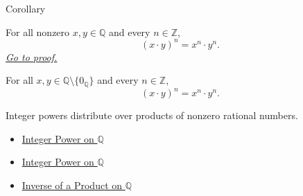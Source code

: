 \begin{corollarybox}{Corollary}
\begin{corollary}
\label{cor:power-of-product-on-q}
For all nonzero $x,y\in\mathbb{Q}$ and every $n\in\mathbb{Z}$,
\[
(x\cdot y)^n=x^n\cdot y^n.
\]
\hyperref[prf:power-of-product-on-q]{\textit{Go to proof.}}
\end{corollary}
\end{corollarybox}

\begin{remark*}
For all $x,y\in\mathbb{Q}\setminus\{0_{\mathbb{Q}}\}$ and every
$n\in\mathbb{Z}$,
\[
(x\cdot y)^n=x^n\cdot y^n.
\]
\end{remark*}

\begin{remark*}[Interpretation]
Integer powers distribute over products of nonzero rational numbers.
\end{remark*}

\begin{dependencies}
\begin{itemize}
  \item \hyperref[def:integer-power-on-q]{Integer Power on $\mathbb{Q}$}
  \item \hyperref[def:integer-power-on-q]{Integer Power on $\mathbb{Q}$}
  \item \hyperref[cor:inverse-of-product-on-q]{Inverse of a Product on $\mathbb{Q}$}
\end{itemize}
\end{dependencies}
